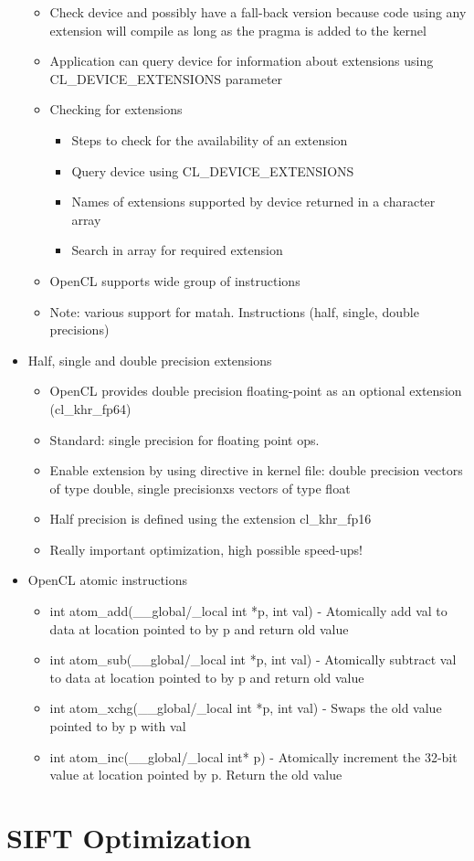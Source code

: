 \documentclass[paper=a4, fontsize=11pt]{scrartcl} %
\numberwithin{equation}{section} %
\numberwithin{figure}{section} %
\numberwithin{table}{section} %
\begin{document}
\begin{itemize}
\begin{itemize}
    \item Check device and possibly have a fall-back version because code using any extension will compile as long as the pragma is added to the kernel
    \item Application can query device for information about extensions using CL_DEVICE_EXTENSIONS parameter
    \item Checking for extensions
    \begin{itemize}
      \item Steps to check for the availability of an extension
      \item Query device using CL_DEVICE_EXTENSIONS
      \item Names of extensions supported by device returned in a character array
      \item Search in array for required extension
    \end{itemize}
    \item OpenCL supports wide group of instructions
    \item Note: various support for matah. Instructions (half, single, double precisions)
  \end{itemize}
  \item Half, single and double precision extensions
  \begin{itemize}
    \item OpenCL provides double precision floating-point as an optional extension (cl_khr_fp64)
    \item Standard: single precision for floating point ops.
    \item Enable extension by using directive in kernel file: double precision vectors of type double, single precisionxs vectors of type float
    \item Half precision is defined using the extension cl_khr_fp16
    \item Really important optimization, high possible speed-ups!
  \end{itemize}
  \item OpenCL atomic instructions
  \begin{itemize}
    \item int atom_add(__global/_local int *p, int val) - Atomically add val to data at location pointed to by p and return old value
    \item int atom_sub(__global/_local int *p, int val) - Atomically subtract val to data at location pointed to by p and return old value
    \item int atom_xchg(__global/_local int *p, int val) - Swaps the old value pointed to by p with val
    \item int atom_inc(__global/_local int* p) - Atomically increment the 32-bit value at location pointed by p. Return the old value
  \end{itemize}
\end{itemize}

\section{SIFT Optimization}
\end{document}
